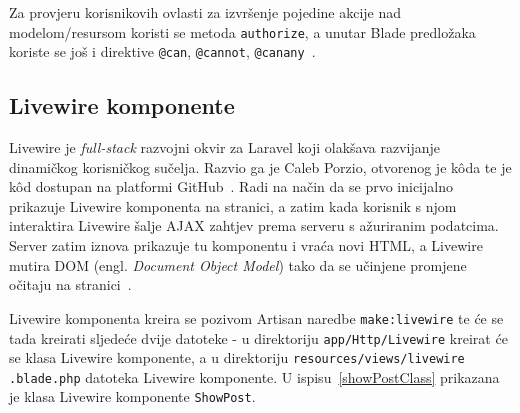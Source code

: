 Za provjeru korisnikovih ovlasti za izvršenje pojedine akcije nad modelom/resursom koristi se metoda \texttt{authorize}, a unutar Blade predložaka koriste se još i direktive \texttt{@can}, \texttt{@cannot}, \texttt{@canany}~\cite{authorization}.

\subsection{Livewire komponente}
Livewire je \textit{full-stack} razvojni okvir za Laravel koji olakšava razvijanje dinamičkog korisničkog sučelja. Razvio ga je Caleb Porzio, otvorenog je k\^oda te je k\^od dostupan na platformi GitHub~\cite{livewireGithub}. Radi na način da se prvo inicijalno prikazuje Livewire komponenta na stranici, a zatim kada korisnik s njom interaktira Livewire šalje AJAX zahtjev prema serveru s ažuriranim podatcima. Server zatim iznova prikazuje tu komponentu i vraća novi HTML, a Livewire mutira DOM (engl. \textit{Document Object Model}) tako da se učinjene promjene očitaju na stranici~\cite{livewire}.

Livewire komponenta kreira se pozivom Artisan naredbe \texttt{make:livewire} te će se tada kreirati sljedeće dvije datoteke - u direktoriju \texttt{app/Http/Livewire} kreirat će se klasa Livewire komponente, a u direktoriju \texttt{resources/views/livewire} \texttt{.blade.php} datoteka Livewire komponente. U ispisu~\ref{showPostClass} prikazana je klasa Livewire komponente \texttt{ShowPost}.

